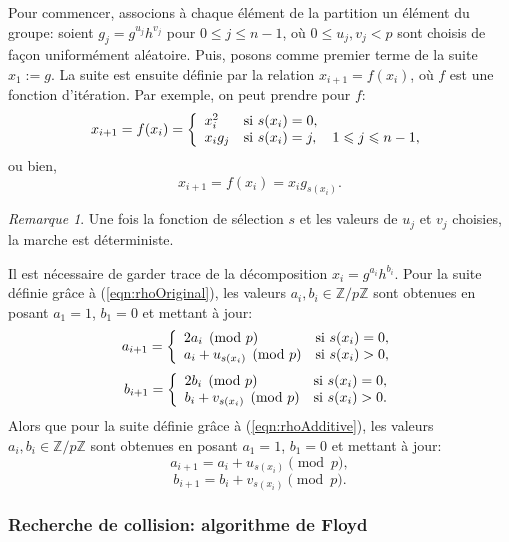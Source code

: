 \documentclass[a4paper, titlepage, 11pt]{article}
\theoremstyle{definition}
\theoremstyle{remark}
\newtheorem{rema}[theo]{Remarque}
\def\Z{\mathbb Z}
\begin{document}
Pour commencer, associons à chaque élément de la partition un élément du groupe: soient $g_j = g^{u_j}h^{v_j}$ pour $0 \leqslant j \leqslant n -1$, où $ 0\leqslant u_j, v_j < p$ sont choisis de façon uniformément aléatoire. Puis, posons comme premier terme de la suite $x_1 := g$. La suite est ensuite définie par la relation $x_{i+1} = f(x_i)$, où $f$ est une fonction d'itération. Par exemple, on peut prendre pour $f$:
\begin{equation}\label{eqn:rhoOriginal}
x_{i+1} = f(x_i) = \left\{ \begin{array}{l l}
x_i^2 & \text{si } s(x_i) = 0,\\
x_ig_j & \text{si } s(x_i) = j, \quad 1 \leqslant j \leqslant n-1,
\end{array} \right.
\end{equation}
ou bien,
\begin{equation}\label{eqn:rhoAdditive}
x_{i+1} = f(x_i) = x_ig_{s(x_i)}.
\end{equation}

\begin{rema}
Une fois la fonction de sélection $s$ et les valeurs de $u_j$ et $v_j$ choisies, la marche est déterministe.
\end{rema}

Il est nécessaire de garder trace de la décomposition $x_i = g^{a_i}h^{b_i}$.
Pour la suite définie grâce à (\ref{eqn:rhoOriginal}), les valeurs $a_i, b_i \in \Z/p\Z$ sont obtenues en posant $a_1 = 1$, $b_1 = 0$ et mettant à jour:
$$a_{i+1} = \left\{\begin{array}{l l}
2a_i \pmod{p} & \text{si } s(x_i) = 0, \\
a_i + u_{s(x_i)} \pmod{p} & \text{si } s(x_i) > 0, \\
\end{array}\right.$$
$$b_{i+1} = \left\{\begin{array}{l l}
2b_i \pmod{p} & \text{si } s(x_i) = 0, \\
b_i + v_{s(x_i)} \pmod{p} & \text{si } s(x_i) > 0. \\
\end{array}\right.$$
Alors que pour la suite définie grâce à (\ref{eqn:rhoAdditive}), les valeurs $a_i, b_i \in \Z/p\Z$ sont obtenues en posant $a_1 = 1$, $b_1 = 0$ et mettant à jour:
$$a_{i+1} = a_i + u_{s(x_i)} \pmod{p}, $$
$$b_{i+1} = b_i + v_{s(x_i)} \pmod{p}.$$

\subsubsection{Recherche de collision: algorithme de Floyd}
\end{document}
